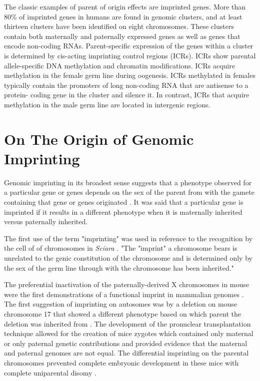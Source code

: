 The classic examples of parent of origin effects are imprinted genes. More than 80\% of imprinted genes in humans are found in genomic clusters, and at least thirteen clusters have been identified on eight chromosomes\cite{Lawson2013,Peters2014,Pires2014,Abramowitz2012}. These clusters contain both maternally and paternally expressed genes as well as genes that encode non-coding RNAs\cite{Peters2014,Abramowitz2012}. Parent-specific expression of the genes within a cluster is determined by cis-acting imprinting control regions (ICRs). ICRs show parental allele-specific DNA methylation and chromatin modifications. ICRs acquire methylation in the female germ line during oogenesis. ICRs methylated in females typically contain the promoters of long non-coding RNA that are antisense to a protein- coding gene in the cluster and silence it. In contrast, ICRs that acquire methylation in the male germ line are located in intergenic regions.

\section{On The Origin of Genomic Imprinting }

Genomic imprinting in its broadest sense suggests that a phenotype observed for a particular gene or genes depends on the sex of the parent from with the gamete containing that gene or genes originated \cite{Sapienza:1989vm}. It was said that a particular gene is imprinted if it results in a different phenotype when it is maternally inherited versus paternally inherited.

The first use of the term "imprinting" was used in reference to the recognition by the cell of of chromosomes in \textit{Sciara} \cite{Crouse:1960vc,Sapienza:1989vm}. "The "imprint" a chromosome bears is unrelated to the genic constitution of the chromosome and is determined only by the sex of the germ line through with the chromosome has been inherited." \cite{Crouse:1960vc} 

The preferential inactivation of the paternally-derived X chromosomes in mouse were the first demonstrations of a functional imprint in mammalian genomes \cite{Takagi:1975ua,Lyon:1984gh,Chandra:1975tb}. The first suggestion of imprinting on autosomes was by a deletion on mouse chromosome 17 that showed a different phenotype based on which parent the deletion was inherited from \cite{Johnson:1974uf,Johnson:1974kc}. The development of the pronuclear transplantation technique allowed for the creation of mice zygotes which contained only maternal or only paternal genetic contributions and provided evidence that the maternal and paternal genomes are not equal. The differential imprinting on the parental chromosomes prevented complete embryonic development in these mice with complete uniparental disomy \cite{Sapienza:1989vm,McGrath:1984ky}. 

